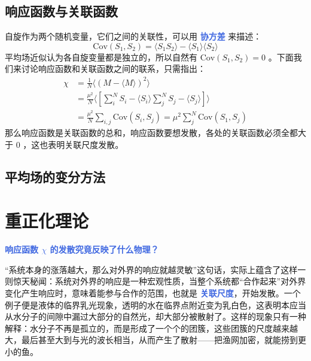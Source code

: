 \subsection{响应函数与关联函数}\label{sec:响应函数与关联函数}

自旋作为两个随机变量，它们之间的关联性，可以用 \textcolor{RoyalBlue}{\textbf{\kaishu 协方差}} 来描述：
\begin{equation}
    \text{Cov}(S_1,S_2) = \langle S_1 S_2 \rangle - \langle S_1 \rangle \langle S_2 \rangle
\end{equation}
平均场近似认为各自旋变量都是独立的，所以自然有 $\text{Cov}(S_1,S_2) = 0$ 。下面我们来讨论响应函数和关联函数之间的联系，只需指出：
\begin{equation}
    \begin{aligned}
        \chi &= \frac{1}{N} \langle (M-\langle M \rangle)^2 \rangle \\
        &= \frac{\mu^2}{N}\langle \left[\sum_i^N S_i - \langle S_i \rangle\sum_j^N S_j - \langle S_j \rangle\right] \rangle \\
        &= \frac{\mu^2}{N} \sum_{i,j}\text{Cov}(S_i,S_j) = \mu^2 \sum_{j}^N\text{Cov}(S_1,S_j)
    \end{aligned}
\end{equation}
那么响应函数是关联函数的总和，响应函数要想发散，各处的关联函数必须全都大于 $0$ ，这也表明关联尺度发散。


\subsection{平均场的变分方法}\label{sub:平均场的变分方法}


\section{重正化理论}

\textcolor{RoyalBlue}{\textbf{\kaishu 响应函数 $\chi$ 的发散究竟反映了什么物理？}}

“系统本身的涨落越大，那么对外界的响应就越灵敏”这句话，实际上蕴含了这样一则惊天秘闻：系统对外界的响应是一种宏观性质，当整个系统都“合作起来”对外界变化产生响应时，意味着能参与合作的范围，也就是 \textcolor{RoyalBlue}{\textbf{\kaishu 关联尺度}}，开始发散。一个例子便是液体的临界乳光现象，透明的水在临界点附近变为乳白色，这表明本应当从水分子的间隙中漏过大部分的自然光，却大部分被散射了。这样的现象只有一种解释：水分子不再是孤立的，而是形成了一个个的团簇，这些团簇的尺度越来越大，最后甚至大到与光的波长相当，从而产生了散射——把渔网加密，就能捞到更小的鱼。

